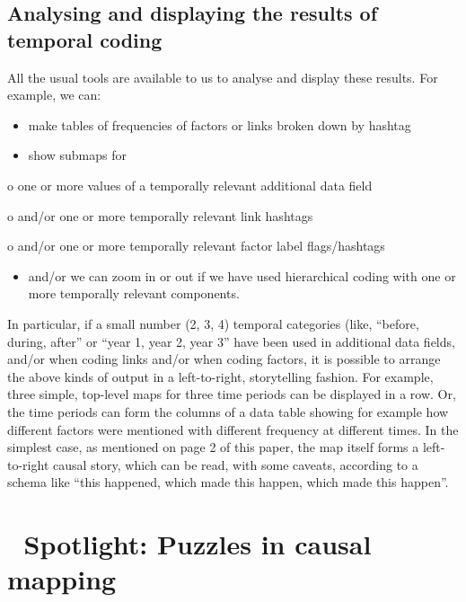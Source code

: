 \documentclass[
]{book}
\providecommand{\tightlist}{%
  \setlength{\itemsep}{0pt}\setlength{\parskip}{0pt}}
\begin{document}
\hypertarget{analysing-and-displaying-the-results-of-temporal-coding}{%
\section{Analysing and displaying the results of temporal coding}\label{analysing-and-displaying-the-results-of-temporal-coding}}

All the usual tools are available to us to analyse and display these results. For example, we can:

\begin{itemize}
\item
  make tables of frequencies of factors or links broken down by hashtag
\item
  show submaps for
\end{itemize}

o one or more values of a temporally relevant additional data field

o and/or one or more temporally relevant link hashtags

o and/or one or more temporally relevant factor label flags/hashtags

\begin{itemize}
\tightlist
\item
  and/or we can zoom in or out if we have used hierarchical coding with one or more temporally relevant components.
\end{itemize}

In particular, if a small number (2, 3, 4) temporal categories (like, ``before, during, after'' or ``year 1, year 2, year 3'' have been used in additional data fields, and/or when coding links and/or when coding factors, it is possible to arrange the above kinds of output in a left-to-right, storytelling fashion. For example, three simple, top-level maps for three time periods can be displayed in a row. Or, the time periods can form the columns of a data table showing for example how different factors were mentioned with different frequency at different times. In the simplest case, as mentioned on page 2 of this paper, the map itself forms a left-to-right causal story, which can be read, with some caveats, according to a schema like ``this happened, which made this happen, which made this happen''.

\hypertarget{spotlight-puzzles-in-causal-mapping}{%
\chapter{🧠 Spotlight: Puzzles in causal mapping}\label{spotlight-puzzles-in-causal-mapping}}
\end{document}

